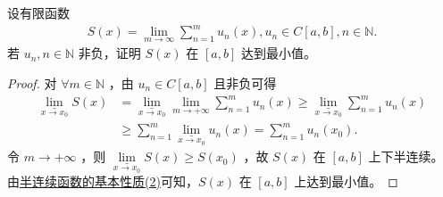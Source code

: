 \documentclass[../../main.tex]{subfiles}%
\begin{document}
\begin{example}
设有限函数
\begin{align*}
S(x) = \lim_{m \to \infty} \sum_{n=1}^{m} u_n(x),  u_n \in C[a,b],  n \in \mathbb{N}.
\end{align*}
若 $u_n, n \in \mathbb{N}$ 非负，证明 $S(x)$ 在 $[a,b]$ 达到最小值。
\end{example}
\begin{proof}

对 $\forall m\in \mathbb{N}$ ，由 $u_n\in C\left[ a,b \right]$ 且非负可得
\begin{align*}
\underset{x\rightarrow x_0}{\underline{\lim }}S\left( x \right) &= \underset{x\rightarrow x_0}{\underline{\lim }}\underset{m\rightarrow +\infty}{\lim}\sum_{n=1}^m{u_n\left( x \right)} \geqslant \underset{x\rightarrow x_0}{\underline{\lim }}\sum_{n=1}^m{u_n\left( x \right)} \\
&\geqslant \sum_{n=1}^m{\underset{x\rightarrow x_0}{\underline{\lim }}u_n\left( x \right)} = \sum_{n=1}^m{u_n\left( x_0 \right)}.
\end{align*}
令 $m\rightarrow +\infty$ ，则 $\underset{x\rightarrow x_0}{\underline{\lim }}S\left( x \right) \geqslant S\left( x_0 \right)$ ，故 $S\left( x \right)$ 在 $\left[ a,b \right]$ 上下半连续。
由\hyperref[proposition:半连续函数基本性质]{半连续函数的基本性质(2)}可知，$S\left( x \right)$ 在 $\left[ a,b \right]$ 上达到最小值。

\end{proof}
\end{document}
